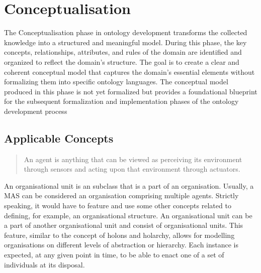\chapter{Conceptualisation}\label{ch:Conceptualisation}


The Conceptualisation phase in ontology development transforms the collected knowledge into a structured and meaningful model. During this phase, the key concepts, relationships, attributes, and rules of the domain are identified and organized to reflect the domain's structure. The goal is to create a clear and coherent conceptual model that captures the domain's essential elements without formalizing them into specific ontology languages. The conceptual model produced in this phase is not yet formalized but provides a foundational blueprint for the subsequent formalization and implementation phases of the ontology development process



\section{Applicable Concepts}

\blockquote[{{\cite[p. 54]{russell2022ArtificialIntelligenceModern}}}]{An agent is anything that can be viewed as perceiving its environment through sensors and acting upon that environment through actuators.} 

 An organisational unit is an  subclass that is a part of an organisation. Usually, a \ac{MAS} can be considered an organisation comprising multiple agents. Strictly speaking, it would have to feature and use some other concepts related to defining, for example, an organisational structure. An organisational unit can be a part of another organisational unit and consist of organisational units. This feature, similar to the concept of holons and holarchy, allows for modelling organisations on different levels of abstraction or hierarchy. Each  instance is expected, at any given point in time, to be able to enact one of a set of  individuals at its disposal. 

